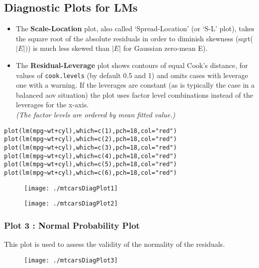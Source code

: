 \documentclass[main.tex]{subfiles}
\begin{document}
\subsection{Diagnostic Plots for LMs}
\begin{itemize}
\item
The \textbf{Scale-Location} plot, also called ‘Spread-Location’ (or ‘S-L’ plot), takes the square root of the absolute residuals in order to diminish skewness (sqrt($|E|)$) is much less skewed than $| E |$ for Gaussian zero-mean E).

\item
The \textbf{Residual-Leverage} plot shows contours of equal Cook's distance, for values of \texttt{cook.levels} (by default 0.5 and 1) and omits cases with leverage one with a warning. If the leverages are constant (as is typically the case in a balanced aov situation) the plot uses factor level combinations instead of the leverages for the x-axis. \\
\textit{(The factor levels are ordered by mean fitted value.)}
\end{itemize}
\begin{framed}
\begin{verbatim}
plot(lm(mpg~wt+cyl),which=c(1),pch=18,col="red")
plot(lm(mpg~wt+cyl),which=c(2),pch=18,col="red")
plot(lm(mpg~wt+cyl),which=c(3),pch=18,col="red")
plot(lm(mpg~wt+cyl),which=c(4),pch=18,col="red")
plot(lm(mpg~wt+cyl),which=c(5),pch=18,col="red")
plot(lm(mpg~wt+cyl),which=c(6),pch=18,col="red")
\end{verbatim}
\end{framed}

\begin{figure}[h!]
\centering
\texttt{[image: ./mtcarsDiagPlot1]}

\label{mtcarsDiagPlot1}
\end{figure}

\newpage
\begin{figure}[h!]
\centering
\texttt{[image: ./mtcarsDiagPlot2]}

\label{mtcarsDiagPlot2}
\end{figure}

\subsubsection{Plot 3 : Normal Probability Plot}
This plot is used to assess the validity of the normality of the residuals.
\begin{figure}[h!]
\centering
\texttt{[image: ./mtcarsDiagPlot3]}

\label{mtcarsDiagPlot3}
\end{figure}
\end{document}
